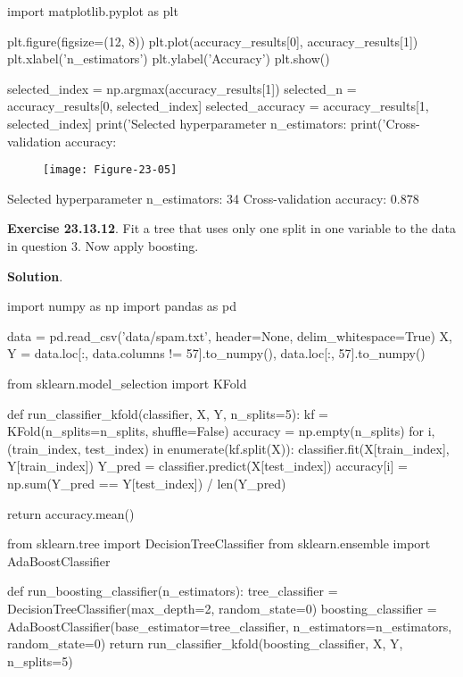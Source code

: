 \begin{python}
import matplotlib.pyplot as plt

plt.figure(figsize=(12, 8))
plt.plot(accuracy_results[0], accuracy_results[1])
plt.xlabel('n_estimators')
plt.ylabel('Accuracy')
plt.show()

selected_{i}ndex = np.argmax(accuracy_results[1])
selected_{n} = accuracy_results[0, selected_{i}ndex]
selected_accuracy = accuracy_results[1, selected_{i}ndex]
print('Selected hyperparameter n_estimators: %
print('Cross-validation accuracy: %
\end{python}

\begin{figure}[H]
\centering
\texttt{[image: Figure-23-05]}
\end{figure}

\begin{console}
Selected hyperparameter n\_estimators: 34
Cross-validation accuracy: 0.878
\end{console}

\textbf{Exercise 23.13.12}. Fit a tree that uses only one split in one
variable to the data in question 3. Now apply boosting.

\textbf{Solution}.

\begin{python}
import numpy as np
import pandas as pd

data = pd.read_csv('data/spam.txt', header=None, delim_whitespace=True)
X, Y = data.loc[:, data.columns != 57].to_{n}umpy(), data.loc[:, 57].to_{n}umpy()
\end{python}

\begin{python}
from sklearn.model_selection import KFold

def run_classifier_{k}fold(classifier, X, Y, n_splits=5):
    kf = KFold(n_splits=n_splits, shuffle=False)
    accuracy = np.empty(n_splits)
    for i, (train_{i}ndex, test_{i}ndex) in enumerate(kf.split(X)):
        classifier.fit(X[train_{i}ndex], Y[train_{i}ndex])
        Y_pred = classifier.predict(X[test_{i}ndex])
        accuracy[i] = np.sum(Y_pred == Y[test_{i}ndex]) / len(Y_pred)
    
    return accuracy.mean()
\end{python}

\begin{python}
from sklearn.tree import DecisionTreeClassifier
from sklearn.ensemble import AdaBoostClassifier

def run_boosting_classifier(n_estimators):
    tree_classifier = DecisionTreeClassifier(max_depth=2, random_state=0)
    boosting_classifier = AdaBoostClassifier(base_estimator=tree_classifier, n_estimators=n_estimators, random_state=0)
    return run_classifier_{k}fold(boosting_classifier, X, Y, n_splits=5)
\end{python}

